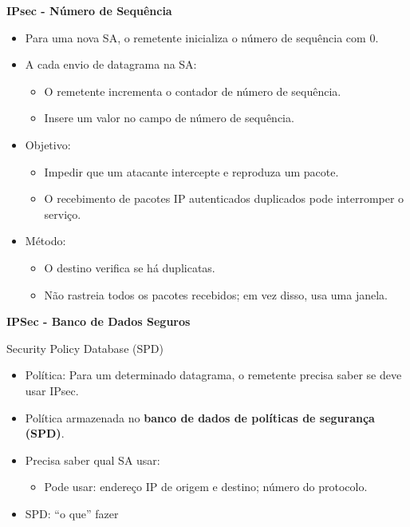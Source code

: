     \textbf{IPsec - Número de Sequência}
    \begin{itemize}[left=0.5cm, align=left, nosep]
        \item Para uma nova SA, o remetente inicializa o número de sequência com 0.
        \item A cada envio de datagrama na SA:
        \begin{itemize}[left=0.5cm, nosep, label=$\hookrightarrow$]
            \item O remetente incrementa o contador de número de sequência.
            \item Insere um valor no campo de número de sequência.
        \end{itemize}
        \item Objetivo:
        \begin{itemize}[left=0.5cm, nosep, label=$\hookrightarrow$]
            \item Impedir que um atacante intercepte e reproduza um pacote.
            \item O recebimento de pacotes IP autenticados duplicados pode interromper o serviço.
        \end{itemize}
        \item Método:
        \begin{itemize}[left=0.5cm, nosep, label=$\hookrightarrow$]
            \item O destino verifica se há duplicatas.
            \item Não rastreia todos os pacotes recebidos; em vez disso, usa uma janela.
        \end{itemize}
    \end{itemize}

    \textbf{IPSec - Banco de Dados Seguros}

    Security Policy Database (SPD)
    \begin{itemize}[left=0.5cm, align=left, nosep]
        \item Política: Para um determinado datagrama, o remetente precisa saber se deve usar IPsec.
        \item Política armazenada no \textbf{banco de dados de políticas de segurança (SPD)}.
        \item Precisa saber qual SA usar:
        \begin{itemize}[left=0.5cm, nosep, label=$\hookrightarrow$]
            \item Pode usar: endereço IP de origem e destino; número do protocolo.
        \end{itemize}
        \item SPD: ``o que'' fazer
    \end{itemize}    

